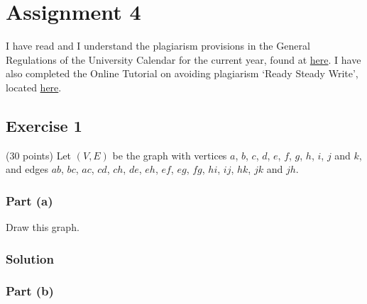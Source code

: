 \documentclass[12pt]{article}
\begin{document}
\section*{Assignment 4}

I have read and I understand the plagiarism provisions in the General Regulations of the University Calendar for the current year, found at \href{http://www.tcd.ie/calendar}{here}.
I have also completed the Online Tutorial on avoiding plagiarism ‘Ready Steady Write’, located \href{http://tcd-ie.libguides.com/plagiarism/ready-steady-write}{here}.

\subsection*{Exercise 1}

(30 points) Let $(V,E)$ be the graph with vertices $a$, $b$, $c$, $d$, $e$, $f$, $g$, $h$, $i$, $j$ and $k$, and edges $ab$, $bc$, $ac$, $cd$, $ch$, $de$, $eh$, $ef$, $eg$, $fg$, $hi$, $ij$, $hk$, $jk$ and $jh$.

\subsubsection*{Part (a)}

Draw this graph.

\subsubsection*{Solution}


\pagebreak
\subsubsection*{Part (b)}
\end{document}
